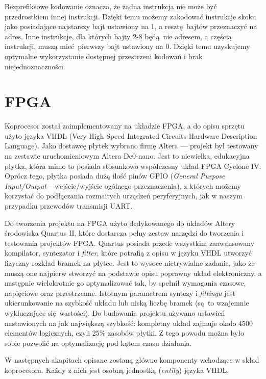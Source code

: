 Bezprefiksowe kodowanie oznacza, że żadna instrukcja nie może być przedrostkiem innej instrukcji. Dzięki temu możemy zakodować instrukcje skoku jako posiadające najstarszy bajt ustawiony na 1, a resztę bajtów przeznaczyć na adres. Inne instrukcje, dla których bajty 2-8 będą nie adresem, a częścią instrukcji, muszą mieć pierwszy bajt ustawiony na 0. Dzięki temu uzyskujemy optymalne wykorzystanie dostępnej przestrzeni kodowań i brak niejednoznaczności.

\section{FPGA}

Koprocesor został zaimplementowany na układzie FPGA, a do opisu sprzętu użyto języka VHDL (Very High Speed Integrated Circuits Hardware Description Language). Jako dostawcę płytek wybrano firmę Altera --- projekt był testowany na zestawie uruchomieniowym Altera De0-nano. Jest to niewielka, edukacyjna płytka, która mimo to posiada stosunkowo współczesny układ FPGA Cyclone IV. Oprócz tego, płytka posiada dużą ilość pinów GPIO (\textit{General Purpose Input/Output} -- wejście/wyjście ogólnego przeznaczenia), z których możemy korzystać do podłączania rozmaitych urządzeń peryferyjnych, jak w naszym przypadku przewodów transmisji UART.

Do tworzenia projektu na FPGA użyto dedykowanego do układów Altery środowiska Quartus II, które dostarcza pełny zestaw narzędzi do tworzenia i testowania projektów FPGA. Quartus posiada przede wszystkim zaawansowany kompilator, syntezator i \textit{fitter}, które potrafią z opisu w języku VHDL utworzyć fizyczny rozkład bramek na płytce. Jest to wysoce nietrywialne zadanie, jako że muszą one najpierw stworzyć na podstawie opisu poprawny układ elektroniczny, a następnie wielokrotnie go optymalizować tak, by spełnił wymagania czasowe, napięciowe oraz przestrzenne. Istotnym parametrem syntezy i \textit{fittingu} jest ukierunkowanie na szybkość układu lub niską liczbę bramek (są to wzajemnie wykluczające się wartości). Do budowania projektu używano ustawień nastawionych na jak największą szybkość: kompletny układ zajmuje około 4500 elementów logicznych, czyli 25\% zasobów płytki. Z tego powodu można było sobie pozwolić na optymalizację pod kątem czasu działania.

W następnych akapitach opisane zostaną główne komponenty wchodzące w skład koprocesora. Każdy z nich jest osobną jednostką (\textit{entity}) języka VHDL.


